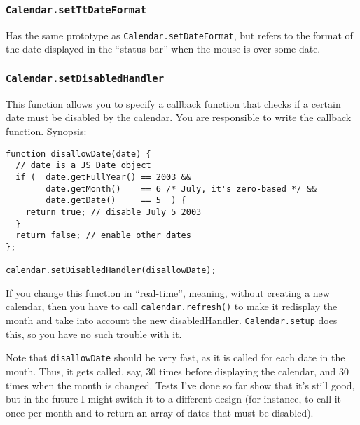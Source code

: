 \documentclass[a4paper,twoside,10pt]{dynadoc}
\begin{document}

\subsubsection{\texttt{Calendar.setTtDateFormat}}\label{sec:Calendar.setTtDateFormat}

Has the same prototype as \texttt{Calendar.setDateFormat}, but refers to the
format of the date displayed in the ``status bar'' when the mouse is over some
date.

\subsubsection{\texttt{Calendar.setDisabledHandler}}\label{sec:Calendar.setDisabledHandler}

This function allows you to specify a callback function that checks if a
certain date must be disabled by the calendar.  You are responsible to write
the callback function.  Synopsis:

\begin{verbatim}
function disallowDate(date) {
  // date is a JS Date object
  if (  date.getFullYear() == 2003 &&
        date.getMonth()    == 6 /* July, it's zero-based */ &&
        date.getDate()     == 5  ) {
    return true; // disable July 5 2003
  }
  return false; // enable other dates
};

calendar.setDisabledHandler(disallowDate);
\end{verbatim}

If you change this function in ``real-time'', meaning, without creating a new
calendar, then you have to call \texttt{calendar.refresh()} to make it
redisplay the month and take into account the new disabledHandler.
\texttt{Calendar.setup} does this, so you have no such trouble with it.

Note that \texttt{disallowDate} should be very fast, as it is called for each
date in the month.  Thus, it gets called, say, 30 times before displaying the
calendar, and 30 times when the month is changed.  Tests I've done so far show
that it's still good, but in the future I might switch it to a different design
(for instance, to call it once per month and to return an array of dates that
must be disabled).
\end{document}
